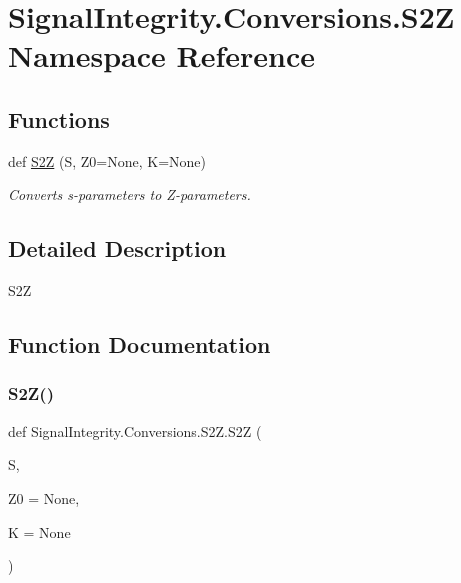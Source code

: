 \hypertarget{namespaceSignalIntegrity_1_1Conversions_1_1S2Z}{}\section{Signal\+Integrity.\+Conversions.\+S2Z Namespace Reference}
\label{namespaceSignalIntegrity_1_1Conversions_1_1S2Z}
\subsection*{Functions}
\begin{DoxyCompactItemize}
\item 
def \hyperlink{namespaceSignalIntegrity_1_1Conversions_1_1S2Z_ab64a581fa6421da330edfcc8258f5949}{S2Z} (S, Z0=None, K=None)
\begin{DoxyCompactList}\small\item\em Converts s-\/parameters to Z-\/parameters. \end{DoxyCompactList}\end{DoxyCompactItemize}


\subsection{Detailed Description}
\begin{DoxyVerb}S2Z\end{DoxyVerb}
 

\subsection{Function Documentation}
\mbox{\label{namespaceSignalIntegrity_1_1Conversions_1_1S2Z_ab64a581fa6421da330edfcc8258f5949}} 
\subsubsection{\texorpdfstring{S2\+Z()}{S2Z()}}
{\footnotesize\ttfamily def Signal\+Integrity.\+Conversions.\+S2\+Z.\+S2Z (\begin{DoxyParamCaption}\item[{}]{S,  }\item[{}]{Z0 = {\ttfamily None},  }\item[{}]{K = {\ttfamily None} }\end{DoxyParamCaption})}



